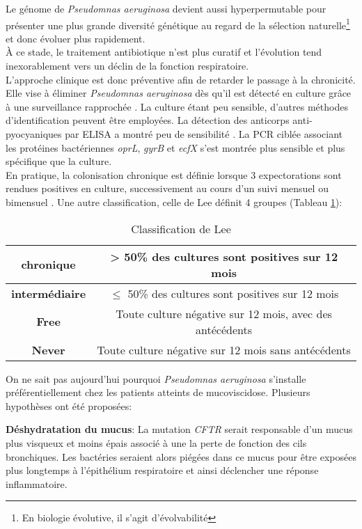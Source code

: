 \documentclass[12pt,a4paper]{article}
\begin{document}
Le génome de \textit{Pseudomnas aeruginosa} devient aussi hyperpermutable\cite{Davies} pour présenter une plus grande diversité génétique au regard de la sélection naturelle\footnote{En biologie évolutive, il s'agit d'évolvabilité} et donc évoluer plus rapidement. \\
À ce stade, le traitement antibiotique n’est plus curatif et l'évolution tend inexorablement vers un déclin de la fonction respiratoire. \\
L'approche clinique est donc préventive afin de retarder le passage à la chronicité. Elle vise à éliminer \textit{Pseudomnas aeruginosa} dès qu'il est détecté en culture grâce à une surveillance rapprochée \cite{LeBourgeois}. La culture étant peu sensible, d’autres méthodes d'identification peuvent être employées. La détection des anticorps anti-pyocyaniques par ELISA a montré peu de sensibilité \cite{Plesiat}.
La PCR ciblée associant les protéines bactériennes \textit{oprL}, \textit{gyrB} et \textit{ecfX}  s’est montrée plus sensible et plus spécifique que la culture\cite{LeGall}. \\
En pratique, la colonisation chronique est définie lorsque 3 expectorations sont rendues positives en culture, successivement au cours d’un suivi mensuel ou bimensuel \cite{LeBourgeois}.
Une autre classification, celle de Lee\cite{Lee2003} définit 4 groupes (Tableau \ref{lee}):

 \begin{table}[h]
     \centering
     \begin{tabular}{|c|c|}
      \hline
          \textbf{chronique} & > 50\% des cultures sont positives sur 12 mois \\
         \hline
         \textbf{intermédiaire} & $\leq$ 50\% des cultures sont positives sur  12 mois\\
          \hline
          \textbf{Free} & Toute culture négative sur 12 mois, avec des antécédents\\
         \hline
	    \textbf{Never} &Toute culture négative sur 12 mois sans antécédents \\
	      \hline
     \end{tabular}
     \caption{Classification de Lee \cite{Lee2003}}
     \label{lee}
 \end{table}


On ne sait pas aujourd’hui pourquoi \textit{Pseudomnas aeruginosa} s’installe préférentiellement chez les patients atteints de mucoviscidose. Plusieurs hypothèses ont été proposées:

\textbf{Déshydratation du mucus}\cite{Davies}:
La mutation \textit{CFTR} serait responsable d'un mucus plus visqueux et moins épais associé à une la perte de fonction des cils bronchiques. Les bactéries seraient alors piégées dans ce mucus pour être exposées plus longtemps à l'épithélium respiratoire et ainsi déclencher une réponse inflammatoire.
\end{document}
